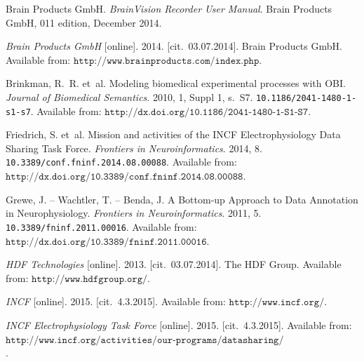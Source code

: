 \documentclass[conference]{IEEEtran}
\begin{document}
\begin{thebibliography}{1}
Brain Products GmbH.
\newblock \emph{BrainVision Recorder User Manual}.
\newblock Brain Products GmbH, 011 edition, December 2014.

\emph{Brain Products GmbH} [online]. 2014. [cit.~03.07.2014].
Brain Products GmbH.
\newblock Available from: $\texttt{{http://www.brainproducts.com/index.php}}$.



{\sc Brinkman}, R.~R. et~al.
\newblock Modeling biomedical experimental processes with {OBI}.
\newblock \emph{Journal of Biomedical Semantics}. 2010, 1, Suppl 1, s.~S7.
\newblock \texttt{10.1186/2041-1480-1-s1-s7}.
\newblock Available from:
$\texttt{{http://dx.doi.org/10.1186/2041-1480-1-S1-S7}}$.



{\sc Friedrich}, S. et~al.
\newblock Mission and activities of the {INCF} Electrophysiology Data Sharing
Task Force.
\newblock \emph{Frontiers in Neuroinformatics}. 2014, 8.
\newblock \texttt{10.3389/conf.fninf.2014.08.00088}.
\newblock Available from:
$\texttt{{http://dx.doi.org/10.3389/conf.fninf.2014.08.00088}}$.



{\sc Grewe}, J. -- {\sc Wachtler}, T. -- {\sc Benda}, J.
\newblock A Bottom-up Approach to Data Annotation in Neurophysiology.
\newblock \emph{Frontiers in Neuroinformatics}. 2011, 5.
\newblock \texttt{10.3389/fninf.2011.00016}.
\newblock Available from:
$\texttt{{http://dx.doi.org/10.3389/fninf.2011.00016}}$.

\emph{HDF Technologies} [online]. 2013. [cit.~03.07.2014]. The HDF Group.
\newblock Available from: $\texttt{{http://www.hdfgroup.org/}}$.

\emph{INCF} [online]. 2015. [cit.~4.3.2015].
\newblock Available from: $\texttt{{http://www.incf.org/}}$.

\emph{INCF Electrophysiology Task Force} [online]. 2015. [cit.~4.3.2015].
\newblock Available from: $\texttt{{http://www.incf.org/activities/our-programs/datasharing/electrophysiology-task-force/}}$.





\end{thebibliography}
\end{document}
